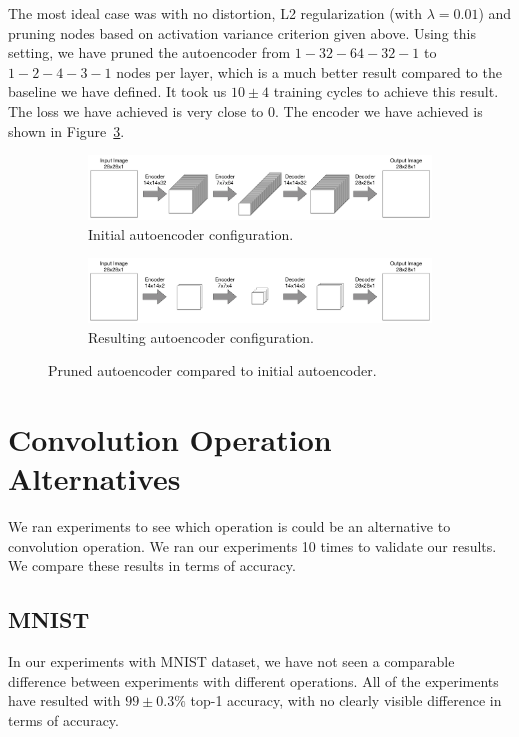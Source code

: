 The most ideal case was with no distortion, L2 regularization (with $\lambda = 0.01$) and pruning nodes based on activation variance criterion given above. Using this setting, we have pruned the autoencoder from $1-32-64-32-1$ to $1-2-4-3-1$ nodes per layer, which is a much better result compared to the baseline we have defined. It took us $10\pm4$ training cycles to achieve this result. The loss we have achieved is very close to 0. The encoder we have achieved is shown in Figure~\ref{fig:pruned_autoencoder}.
\begin{figure}[!h]
    \begin{subfigure}{1\textwidth}
        \hspace{-.1\linewidth}
        \includegraphics[width=1.2\linewidth]{images/over_parameterized_autoencoder.pdf}
        \caption{Initial autoencoder configuration.}
        \label{fig:initial_autoencoder}
    \end{subfigure}
    \begin{subfigure}{1\textwidth}
        \hspace{-.1\linewidth}
        \includegraphics[width=1.2\linewidth]{images/optimum_autoencoder.pdf}
        \caption{Resulting autoencoder configuration.}
        \label{fig:pruned_autoencoder}
    \end{subfigure}
    \caption{Pruned autoencoder compared to initial autoencoder.}
    \label{fig:pruned_autoencoder}
\end{figure}

\newpage
\section{Convolution Operation Alternatives}
We ran experiments to see which operation is could be an alternative to convolution operation. We ran our experiments 10 times to validate our results. We compare these results in terms of accuracy.
\subsection{MNIST}
In our experiments with MNIST dataset, we have not seen a comparable difference between experiments with different operations. All of the experiments have resulted with $99\pm0.3\%$ top-1 accuracy, with no clearly visible difference in terms of accuracy.
